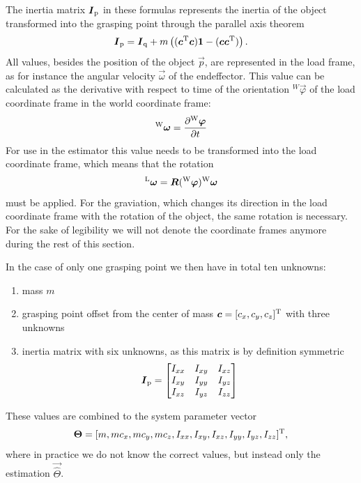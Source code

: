 The inertia matrix $\boldsymbol{I}_{\mathrm{p}}$ in these formulas represents the inertia of the object transformed into the grasping point through the parallel axis theorem
\begin{equation}
	\boldsymbol{I}_{\mathrm{p}} = \boldsymbol{I}_{\mathrm{q}} + m \left( (\boldsymbol{c}^{\mathrm{T}} \boldsymbol{c}) \boldsymbol{1} - (\boldsymbol{c} \boldsymbol{c}^{\mathrm{T}}) \right).
\end{equation}
All values, besides the position of the object $\vec p$, are represented in the load frame, as for instance the angular velocity $\vec \omega$ of the endeffector. This value can be calculated as the derivative with respect to time of the orientation $^W\vec{\varphi}$ of the load coordinate frame in the world coordinate frame:
\begin{equation}
	{^{\mathrm{W}}}\boldsymbol{\omega} = \frac{\partial {^{\mathrm{W}}}\boldsymbol{\varphi}}{\partial t}
\end{equation}
For use in the estimator this value needs to be transformed into the load coordinate frame, which means that the rotation
\begin{equation}
	^{\mathrm{L}}\boldsymbol{\omega} = \boldsymbol{R}({^{\mathrm{W}}}\boldsymbol{\varphi}) {^{\mathrm{W}}}\boldsymbol{\omega}
\end{equation}
must be applied. For the graviation, which changes its direction in the load coordinate frame with the rotation of the object, the same rotation is necessary. For the sake of legibility we will not denote the coordinate frames anymore during the rest of this section.

In the case of only one grasping point we then have in total ten unknowns:
\begin{enumerate}
	\item mass $m$
	\item grasping point offset from the center of mass $\boldsymbol{c} = [c_x, c_y, c_z]^{\mathrm{T}}$ with three unknowns
	\item inertia matrix with six unknowns, as this matrix is by definition symmetric
	\begin{equation}
		\boldsymbol{I}_{\mathrm{p}} = 
		\begin{bmatrix}	
			I_{xx}	& I_{xy}	& I_{xz} \\
			I_{xy}	& I_{yy}	& I_{yz} \\
			I_{xz}	& I_{yz}	& I_{zz}
		\end{bmatrix}
	\end{equation}
\end{enumerate}

These values are combined to the system parameter vector
\begin{equation}
	\boldsymbol{\Theta} = [m, m c_x, m c_y, m c_z, I_{xx}, I_{xy}, I_{xz}, I_{yy},I_{yz}, I_{zz}]^{\mathrm{T}},
\end{equation}
where in practice we do not know the correct values, but instead only the estimation $\vec{\hat \Theta}$.

